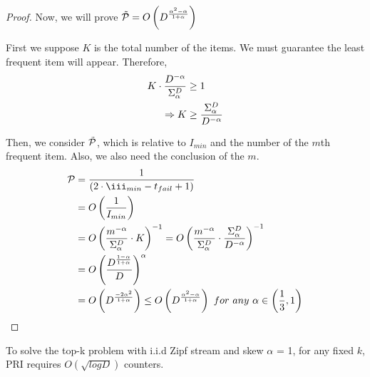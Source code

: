 \begin{proof}
Now, we will prove $\Tilde{\mathcal{P}} = O\left(D^{\frac{\alpha^2-\alpha}{1+\alpha}}\right)$

First we suppose $K$ is the total number of the items. We must guarantee the least frequent item will appear. Therefore,
\begin{equation}
\begin{aligned}
\centering  
    K\cdot\frac{D^{-\alpha}}{\Sigma_\alpha^D}&\geq1\\
    \Rightarrow K&\geq\frac{\Sigma_\alpha^D}{D^{-\alpha}}  
\end{aligned}
\end{equation}

Then, we consider $\Tilde{\mathcal{P}}$, which is relative to $I_{min}$ and the number of the $m$th frequent item. Also, we also need the conclusion of the $m$.
\begin{equation}
\begin{aligned}
\centering  
\mathcal{P}&=\frac{1}{(2\cdot\iii_{min}-t_{fail}+1)}\\
&=O\left(\frac{1}{I_{min}}\right)\\
&=O\left(\frac{m^{-\alpha}}{\Sigma_\alpha^D}\cdot K\right)^{-1}=O\left(\frac{m^{-\alpha}}{\Sigma_\alpha^D}\cdot \frac{\Sigma_\alpha^D}{D^{-\alpha}}\right)^{-1}\\
&=O\left(\frac{D^{\frac{1-\alpha}{1+\alpha}}}{D}\right)^\alpha\\
&=O\left(D^{\frac{-2\alpha^2}{1+\alpha}}\right)\leq O\left(D^{\frac{\alpha^2-\alpha}{1+\alpha}}\right)~for~any~ \alpha \in \left(\frac{1}{3},1\right)
\end{aligned}
\end{equation}
\end{proof}

\begin{theorem}
	To solve the top-k problem with i.i.d Zipf stream and skew $\alpha$ = 1, for any fixed $k$, PRI requires $O(\sqrt{logD})$ counters.
\end{theorem}

